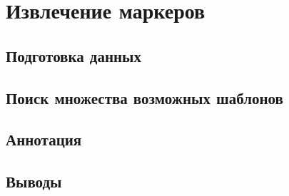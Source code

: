 \chapter{Извлечение маркеров}
\section{Подготовка данных}
\section{Поиск множества возможных шаблонов}
\section{Аннотация}
\section{Выводы}
